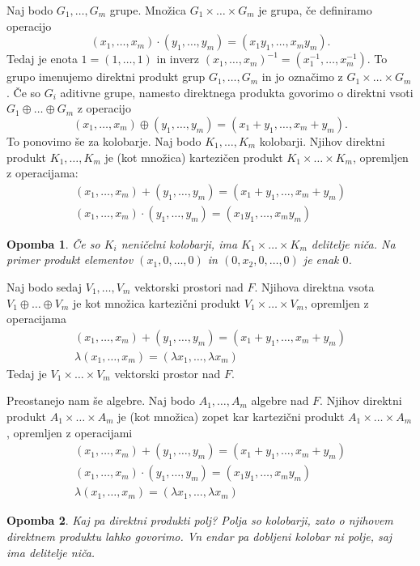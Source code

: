 \documentclass[10pt, a4paper]{article}
\newtheorem*{opomba}{Opomba}
\begin{document}
Naj bodo $G_1, \dots, G_m$ grupe.
Množica $G_1 \times \dots \times G_m$ je grupa, če definiramo 
operacijo $$(x_1, \dots, x_m) \cdot (y_1, \dots, y_m) = (x_1 y_1, \dots, x_m y_m).$$
Tedaj je enota $1 = (1, \dots, 1)$ in inverz $(x_1, \dots, x_m)^{-1} = (x_1 ^{-1}, \dots, x_m ^{-1})$.
To grupo imenujemo direktni produkt grup $G_1, \dots, G_m$ in jo označimo z $G_1 \times \dots \times G_m$.
Če so $G_i$ aditivne grupe, namesto direktnega produkta govorimo o direktni vsoti 
$G_1 \oplus \dots \oplus G_m$ z operacijo 
$$(x_1, \dots, x_m) \oplus (y_1, \dots, y_m) = (x_1 + y_1, \dots, x_m + y_m).$$
To ponovimo še za kolobarje.
Naj bodo $K_1, \dots, K_m$ kolobarji. 
Njihov direktni produkt $K_1, \dots, K_m$ je (kot množica)
kartezičen produkt $K_1 \times \dots \times K_m$, opremljen z operacijama:
\begin{gather*}
  (x_1, \dots, x_m) + (y_1, \dots, y_m) = (x_1 + y_1, \dots, x_m + y_m)\\
  (x_1, \dots, x_m) \cdot (y_1, \dots, y_m) = (x_1 y_1, \dots, x_m y_m)
\end{gather*}
\vspace*{-7mm}
\begin{opomba}
  Če so $K_i$ neničelni kolobarji, ima $K_1 \times \dots \times K_m$ delitelje niča.
  Na primer produkt elementov $(x_1, 0, \dots, 0)$ in $(0, x_2, 0, \dots, 0)$ je enak $0$.
\end{opomba}

Naj bodo sedaj $V_1, \dots, V_m$ vektorski prostori nad $F$.
Njihova direktna vsota $V_1 \oplus \dots \oplus V_m$ je kot množica kartezični produkt 
$V_1 \times \dots \times V_m$, opremljen z operacijama 
\begin{gather*}
  (x_1, \dots, x_m) + (y_1, \dots, y_m) = (x_1 + y_1, \dots, x_m + y_m)\\
  \lambda (x_1, \dots, x_m) = (\lambda x_1, \dots, \lambda x_m)
\end{gather*}
Tedaj je $V_1 \times \dots \times V_m$ vektorski prostor nad $F$.

Preostanejo nam še algebre. Naj bodo $A_1, \dots, A_m$ algebre nad $F$.
Njihov direktni produkt $A_1 \times \dots \times A_m$ je (kot množica) zopet 
kar kartezični produkt $A_1 \times \dots \times A_m$, opremljen z operacijami 
\begin{gather*}
  (x_1, \dots, x_m) + (y_1, \dots, y_m) = (x_1 + y_1, \dots, x_m + y_m)\\
  (x_1, \dots, x_m) \cdot (y_1, \dots, y_m) = (x_1 y_1, \dots, x_m y_m)\\
  \lambda (x_1, \dots, x_m) = (\lambda x_1, \dots, \lambda x_m)
\end{gather*}
\vspace*{-7mm}
\begin{opomba}
  Kaj pa direktni produkti polj? Polja so kolobarji, zato o njihovem direktnem produktu lahko govorimo.
  Vn endar pa dobljeni kolobar ni polje, saj ima delitelje niča.
\end{opomba}
\end{document}
